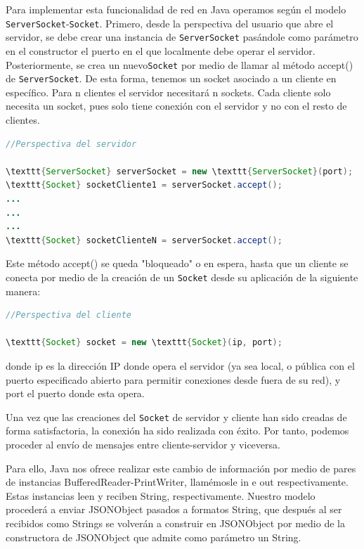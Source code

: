 \documentclass[12pt,a4paper,openright]{book}
\theoremstyle{break}
\begin{document}
Para implementar esta funcionalidad de red en Java operamos según el modelo \texttt{ServerSocket}-\texttt{Socket}. Primero, desde la perspectiva del usuario que abre el servidor, se debe crear una instancia de \texttt{ServerSocket} pasándole como parámetro en el constructor el puerto en el que localmente debe operar el servidor. Posteriormente, se crea un nuevo\texttt{Socket} por medio de llamar al método accept() de \texttt{ServerSocket}. De esta forma, tenemos un socket asociado a un cliente en específico. Para n clientes el servidor necesitará n sockets. Cada cliente solo necesita un socket, pues solo tiene conexión con el servidor y no con el resto de clientes.

\begin{lstlisting}[frame=single, language=Java]
//Perspectiva del servidor

\texttt{ServerSocket} serverSocket = new \texttt{ServerSocket}(port);
\texttt{Socket} socketCliente1 = serverSocket.accept();
...
...
...
\texttt{Socket} socketClienteN = serverSocket.accept();

\end{lstlisting}


Este método accept() se queda "bloqueado" o en espera, hasta que un cliente se conecta por medio de la creación de un \texttt{Socket} desde su aplicación de la siguiente manera:

\begin{lstlisting}[frame=single, language=Java]
//Perspectiva del cliente

\texttt{Socket} socket = new \texttt{Socket}(ip, port);

\end{lstlisting}

donde ip es la dirección IP donde opera el servidor (ya sea local, o pública con el puerto especificado abierto para permitir conexiones desde fuera de su red), y port el puerto donde esta opera.

Una vez que las creaciones del \texttt{Socket} de servidor y cliente han sido creadas de forma satisfactoria, la conexión ha sido realizada con éxito. Por tanto, podemos proceder al envío de mensajes entre cliente-servidor y viceversa.

Para ello, Java nos ofrece realizar este cambio de información por medio de pares de instancias BufferedReader-PrintWriter, llamémosle in e out respectivamente. Estas instancias leen y reciben String, respectivamente. Nuestro modelo procederá a enviar JSONObject pasados a formatos String, que después al ser recibidos como Strings se volverán a construir en JSONObject por medio de la constructora de JSONObject que admite como parámetro un String.
\end{document}
